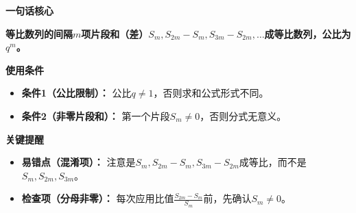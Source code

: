 \begin{summarybox}
	\textbf{\textcolor{CSummary}{一句话核心}}

	\textbf{等比数列的间隔$m$项片段和（差）$S_m, S_{2m}-S_m, S_{3m}-S_{2m},\ldots$成等比数列，公比为$q^m$。}

	\medskip
	\textbf{\textcolor{CSummary}{使用条件}}
	\begin{itemize}[leftmargin=*, itemsep=0.5em, topsep=0.4em]
		\item \textbf{条件1（公比限制）：} 公比$q\neq 1$，否则求和公式形式不同。
		\item \textbf{条件2（非零片段和）：} 第一个片段$S_m\neq 0$，否则分式无意义。
	\end{itemize}

	\medskip
	\textbf{\textcolor{CSummary}{关键提醒}}
	\begin{itemize}[leftmargin=*, itemsep=0.5em, topsep=0.4em]
		\item \textbf{易错点（混淆项）：} 注意是$S_m, S_{2m}-S_m, S_{3m}-S_{2m}$成等比，而不是$S_m, S_{2m}, S_{3m}$。
		\item \textbf{检查项（分母非零）：} 每次应用比值$\frac{S_{2m}-S_m}{S_m}$前，先确认$S_m\neq 0$。
	\end{itemize}
\end{summarybox}

